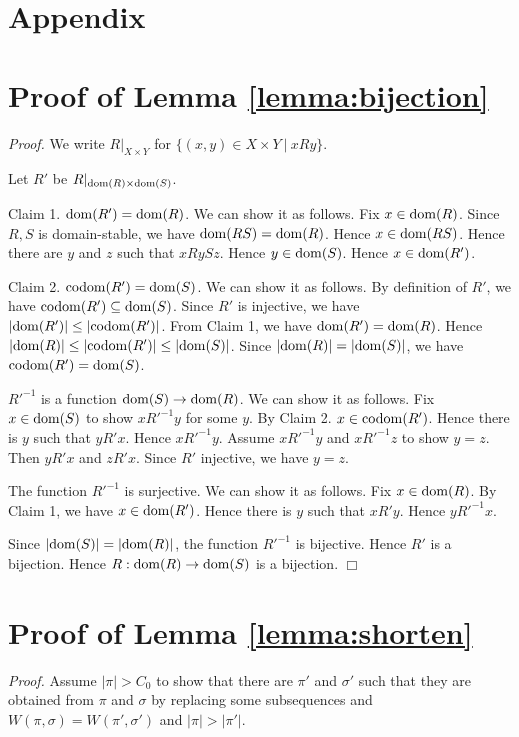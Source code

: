 \appendix
\section*{Appendix}

\section{Proof of Lemma \ref{lemma:bijection}}

{\em Proof.}
We write $R|_{X \times Y}$ for $\{ (x,y) \in X \times Y \ |\ xRy \}$.

Let $R'$ be $R|_{{\rm dom}(R) \times {\rm dom}(S)}$.

Claim 1. ${\rm dom}(R')={\rm dom}(R)$.
We can show it as follows.
Fix $x \in {\rm dom}(R)$.
Since $R,S$ is domain-stable, we have ${\rm dom}(RS) = {\rm dom}(R)$.
Hence $x \in {\rm dom}(RS)$.
Hence there are $y$ and $z$ such that $x R y S z$.
Hence $y \in {\rm dom}(S)$.
Hence $x \in {\rm dom}(R')$.

Claim 2. ${\rm codom}(R')={\rm dom}(S)$.
We can show it as follows.
By definition of $R'$, we have ${\rm codom}(R') \subseteq {\rm dom}(S)$.
Since $R'$ is injective, we have $|{\rm dom}(R')| \le |{\rm codom}(R')|$.
From Claim 1, we have ${\rm dom}(R')={\rm dom}(R)$.
Hence $|{\rm dom}(R)| \le |{\rm codom}(R')| \le |{\rm dom}(S)|$.
Since $|{\rm dom}(R)| = |{\rm dom}(S)|$, we have ${\rm codom}(R')={\rm dom}(S)$.

$R'^{-1}$ is a function ${\rm dom}(S) \to {\rm dom}(R)$.
We can show it as follows.
Fix $x \in {\rm dom}(S)$ to show $x R'^{-1} y$ for some $y$.
By Claim 2. $x \in {\rm codom}(R')$. Hence there is $y$ such that $y R' x$.
Hence $x R'^{-1} y$.
Assume $x R'^{-1} y$ and $x R'^{-1} z$ to show $y=z$.
Then $y R' x$ and $z R' x$.
Since $R'$ injective, we have $y=z$.

The function $R'^{-1}$ is surjective.
We can show it as follows.
Fix $x \in {\rm dom}(R)$.
By Claim 1, we have $x \in {\rm dom}(R')$.
Hence there is $y$ such that $x R' y$.
Hence $y R'^{-1} x$.

Since $|{\rm dom}(S)|=|{\rm dom}(R)|$, the function $R'^{-1}$ is bijective.
Hence $R'$ is a bijection.
Hence $R:{\rm dom}(R) \to {\rm dom}(S)$ is a bijection.
$\Box$

\section{Proof of Lemma \ref{lemma:shorten}}

{\em Proof.}
Assume $|\pi| > C_0$
to show that there are $\pi'$ and $\sigma'$ such that
they are obtained from $\pi$ and $\sigma$ by replacing some subsequences
and $W(\pi,\sigma) = W(\pi',\sigma')$ and $|\pi|>|\pi'|$.

